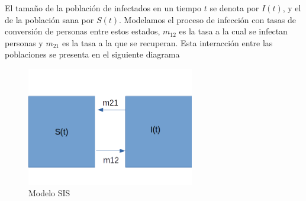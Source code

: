 \documentclass{article}
\begin{document}
\noindent
El tamaño de la población de infectados en un tiempo $t$ se denota por $I(t)$, y el de la población sana por $S(t)$. Modelamos el proceso de infección con tasas de conversión de personas entre estos estados, $m_{12}$ es la tasa a la cual se infectan personas y $m_{21}$ es la tasa a la que se recuperan. Esta interacción entre las poblaciones se presenta en el siguiente diagrama 
\begin{figure}[H]
    \centering
    \includegraphics[width=0.65\textwidth]{malf.png}
    \caption{Modelo SIS}
    \label{fig:my_label}
\end{figure}
\end{document}
